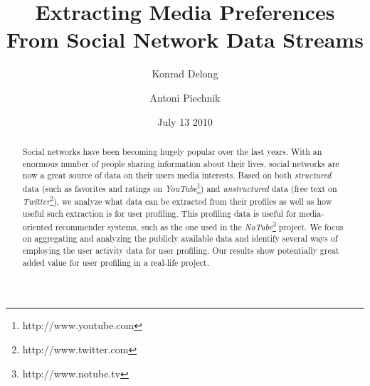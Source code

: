 \documentclass{article}
\begin{document}
\title{\textbf{Extracting Media Preferences From Social Network Data Streams}}
\author{Konrad Delong \and Antoni Piechnik}
\date{July 13 2010}

\maketitle

\begin{abstract} Social networks have been becoming hugely popular over the last
years. With an enormous number of people sharing information about their lives,
social networks are now a great source of data on their users media interests. Based on both
\textit{structured} data (such as favorites and ratings on \textit{YouTube}\footnote{http://www.youtube.com})
and \textit{unstructured} data (free text on \textit{Twitter}\footnote{http://www.twitter.com}),
we analyze what data can be extracted from their profiles as well as how useful such extraction
is for user profiling. This profiling data is useful for media-oriented recommender
systems, such as the one used in the \textit{NoTube}\footnote{http://www.notube.tv} project.
We focus on aggregating and analyzing the publicly available data and
identify several ways of employing the user activity data for user profiling.
Our results show potentially great added value for user profiling in a real-life project.
\end{abstract}







%

%

%











\end{document}
